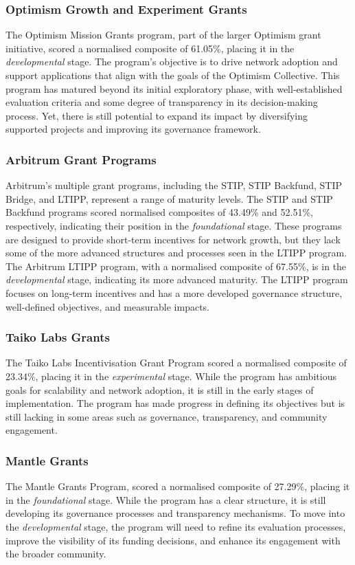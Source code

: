 \documentclass[conference]{IEEEtran}
\begin{document}
\subsubsection{Optimism Growth and Experiment Grants}\label{sec_4.2.1}
The Optimism Mission Grants program, part of the larger Optimism grant initiative, scored a normalised composite of 61.05\%, placing it in the \textit{developmental} stage. The program’s objective is to drive network adoption and support applications that align with the goals of the Optimism Collective. This program has matured beyond its initial exploratory phase, with well-established evaluation criteria and some degree of transparency in its decision-making process. Yet, there is still potential to expand its impact by diversifying supported projects and improving its governance framework.

\subsubsection{Arbitrum Grant Programs}\label{sec_4.2.2}
Arbitrum’s multiple grant programs, including the STIP, STIP Backfund, STIP Bridge, and LTIPP, represent a range of maturity levels. The STIP and STIP Backfund programs scored normalised composites of 43.49\% and 52.51\%, respectively, indicating their position in the \textit{foundational} stage. These programs are designed to provide short-term incentives for network growth, but they lack some of the more advanced structures and processes seen in the LTIPP program. The Arbitrum LTIPP program, with a normalised composite of 67.55\%, is in the \textit{developmental} stage, indicating its more advanced maturity. The LTIPP program focuses on long-term incentives and has a more developed governance structure, well-defined objectives, and measurable impacts.

\subsubsection{Taiko Labs Grants}\label{sec_4.2.3}
The Taiko Labs Incentivisation Grant Program scored a normalised composite of 23.34\%, placing it in the \textit{experimental} stage. While the program has ambitious goals for scalability and network adoption, it is still in the early stages of implementation. The program has made progress in defining its objectives but is still lacking in some areas such as governance, transparency, and community engagement.

\subsubsection{Mantle Grants}\label{sec_4.2.4}
The Mantle Grants Program, scored a normalised composite of 27.29\%, placing it in the \textit{foundational} stage. While the program has a clear structure, it is still developing its governance processes and transparency mechanisms. To move into the \textit{developmental} stage, the program will need to refine its evaluation processes, improve the visibility of its funding decisions, and enhance its engagement with the broader community.
\end{document}
